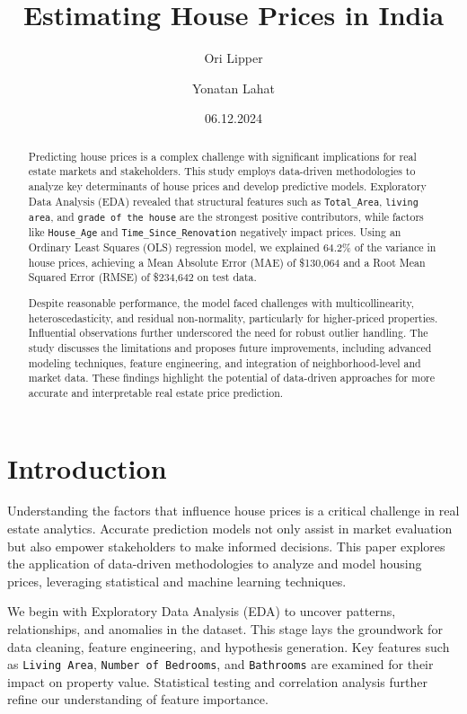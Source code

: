 \documentclass[11pt]{article}
\title{Estimating House Prices in India}
\author{Ori Lipper \and Yonatan Lahat}
\date{06.12.2024}
\begin{document}
\maketitle




\begin{abstract}
Predicting house prices is a complex challenge with significant implications for real estate markets and stakeholders. This study employs data-driven methodologies to analyze key determinants of house prices and develop predictive models. Exploratory Data Analysis (EDA) revealed that structural features such as \texttt{Total\_Area}, \texttt{living area}, and \texttt{grade of the house} are the strongest positive contributors, while factors like \texttt{House\_Age} and \texttt{Time\_Since\_Renovation} negatively impact prices. Using an Ordinary Least Squares (OLS) regression model, we explained 64.2\% of the variance in house prices, achieving a Mean Absolute Error (MAE) of \$130,064 and a Root Mean Squared Error (RMSE) of \$234,642 on test data. 

Despite reasonable performance, the model faced challenges with multicollinearity, heteroscedasticity, and residual non-normality, particularly for higher-priced properties. Influential observations further underscored the need for robust outlier handling. The study discusses the limitations and proposes future improvements, including advanced modeling techniques, feature engineering, and integration of neighborhood-level and market data. These findings highlight the potential of data-driven approaches for more accurate and interpretable real estate price prediction.
\end{abstract}


\section{Introduction}

Understanding the factors that influence house prices is a critical challenge in real estate analytics. Accurate prediction models not only assist in market evaluation but also empower stakeholders to make informed decisions. This paper explores the application of data-driven methodologies to analyze and model housing prices, leveraging statistical and machine learning techniques.

We begin with Exploratory Data Analysis (EDA) to uncover patterns, relationships, and anomalies in the dataset. This stage lays the groundwork for data cleaning, feature engineering, and hypothesis generation. Key features such as \texttt{Living Area}, \texttt{Number of Bedrooms}, and \texttt{Bathrooms} are examined for their impact on property value. Statistical testing and correlation analysis further refine our understanding of feature importance.
\end{document}
